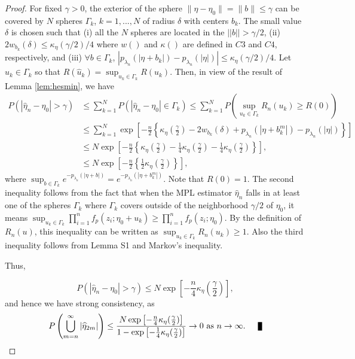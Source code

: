 \documentclass[11pt]{statsoc}
\begin{document}
\begin{proof}
For fixed $\gamma>0$, the
exterior of the sphere $\|\eta-\eta_0\|=\|b\|\leq \gamma $ can be covered by $N$
spheres $\Gamma_k$, $k=1,...,N$ of radius $\delta$ with centers $b_k$. The
small value $\delta$ is chosen such that (i) all the $N$ spheres are located in the
$||b||>\gamma/2$, (ii) $2w_{b_k}(\delta) \leq \kappa_{\eta}(\gamma/2)/4$ where $w()$ and $\kappa()$ are defined in $C3$ and $C4$, respectively, and (iii) $\forall b \in \Gamma_k$, $|p_{\lambda_n}(|\eta+b_k|)-p_{\lambda_n}(|\eta|)| \leq \kappa_{\eta}(\gamma/2)/4$. Let $u_k \in \Gamma_k$ so that $R(\hat u_k) = \sup_{u_k \in \Gamma_k} R(u_k)$. Then, in view of
the result of Lemma \ref{lem:hesmin}, we have
\begin{align*}
P(|\widehat \eta_{n} -\eta_0|>\gamma) &\leq \sum_{k=1}^N P(|\widehat \eta_{n} -\eta_0| \in \Gamma_k)  \leq \sum_{k=1}^N  P(\sup_{ u_k \in\Gamma_k} R_n( u_k)\geq R(0))  \\
& \leq \sum_{k=1}^N \exp \left[ -\frac{n}{2} \left\{ \kappa_{\eta}(\frac{\gamma}{2}) - 2w_{b_k}(\delta)  +p_{\lambda_n}(|\eta+b_k^m|)-p_{\lambda_n}(|\eta|)\right\} \right] \\
 & \leq N \exp \left[ -\frac{n}{2}\left\{ \kappa_{\eta}(\frac{\gamma}{2}) - \frac{1}{4}\kappa_{\eta}(\frac{\gamma}{2})  - \frac{1}{4}\kappa_{\eta}(\frac{\gamma}{2})\right\} \right],\\
 & \leq N \exp \left[ -\frac{n}{2}\left\{ \frac{1}{2}\kappa_{\eta}(\frac{\gamma}{2})\right\} \right],
\end{align*}
where $\sup_{b \in \Gamma_k} e^{- p_{\lambda_n}(|\eta+b|)}=e^{-p_{\lambda_n}(|\eta+b_k^m|)}$. Note that $R(0)=1$. The second inequality follows from the fact that when the MPL estimator $\hat \eta_n$ falls in at least one of the spheres $\Gamma_k$ where $\Gamma_k$ covers  outside of the neighborhood $\gamma/2$ of $\eta_0$, it means $\sup_{u_k\in \Gamma_k} \prod_{i=1}^n f_p(z_i;\eta_0+u_k)  \geq \prod_{i=1}^n f_p(z_i;\eta_0)$. By the definition of $R_n(u)$, this inequality can be written as $\sup_{ u_k \in\Gamma_k} R_n( u_k)\geq 1$.
Also the third inequality follows from Lemma S1 and
Markov's inequality.

Thus,

\[
P(|\widehat \eta_{n} -\eta_0|>\gamma) \leq N \exp \left[ -\frac{n}{4} \kappa_{\eta}(\frac{\gamma}{2}) \right],
\]
and hence we have strong consistency, as
\[
P\left( \bigcup_{m=n}^{\infty} |\widehat \eta_{2m}| \right) \leq
\frac{N \exp \left[ -\frac{n}{4} \kappa_{\eta}(\frac{\gamma}{2}) \right]}
{1- \exp \left[ -\frac{1}{4} \kappa_{\eta}(\frac{\gamma}{2}) \right]} \rightarrow 0 \text{ as } n\rightarrow \infty.
{\nobreak \ifvmode \relax \else
      \ifdim\lastskip<1.5em \hskip-\lastskip
      \hskip1.5em plus0em minus0.5em \fi \nobreak
      \vrule height0.75em width0.5em depth0.25em\fi}
\]
\end{proof}
\end{document}
